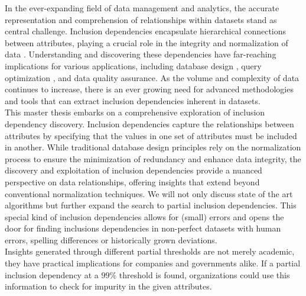 In the ever-expanding field of data management and analytics, the accurate representation and comprehension of relationships within datasets stand as central challenge. Inclusion dependencies encapsulate hierarchical connections between attributes, playing a crucial role in the integrity and normalization of data \cite{casanova1982inclusion}. Understanding and discovering these dependencies have far-reaching implications for various applications, including database design \cite{levene2000justification}, query optimization \cite{gryz1998query}, and data quality assurance. As the volume and complexity of data continues to increase, there is an ever growing need for advanced methodologies and tools that can extract inclusion dependencies inherent in datasets. \\

This master thesis embarks on a comprehensive exploration of inclusion dependency discovery. Inclusion dependencies capture the relationships between attributes by specifying that the values in one set of attributes must be included in another. While traditional database design principles rely on the normalization process to ensure the minimization of redundancy and enhance data integrity, the discovery and exploitation of inclusion dependencies provide a nuanced perspective on data relationships, offering insights that extend beyond conventional normalization techniques. We will not only discuss state of the art algorithms but further expand the search to partial inclusion dependencies. This special kind of inclusion dependencies allows for (small) errors and opens the door for finding inclusions dependencies in non-perfect datasets with human errors, spelling differences or historically grown deviations. \\

Insights generated through different partial thresholds are not merely academic, they have practical implications for companies and governments alike. If a partial inclusion dependency at a $99\%$ threshold is found, organizations could use this information to check for impurity in the given attributes.